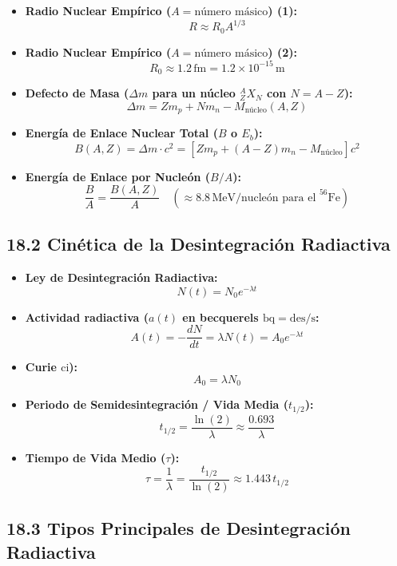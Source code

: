 \documentclass[11pt,a4paper]{article}
\begin{document}
\begin{itemize}
  \item \textbf{Radio Nuclear Empírico ($A = \text{número másico}$) (1):}
  \[
    R \approx R_0 A^{1/3}
  \]
  \item \textbf{Radio Nuclear Empírico ($A = \text{número másico}$) (2):}
  \[
    R_0 \approx 1.2 \, \mathrm{fm} = 1.2 \times 10^{-15} \, \mathrm{m}
  \]
  \item \textbf{Defecto de Masa ($\Delta m$ para un núcleo $_Z^A X_N$ con $N = A - Z$):}
  \[
    \Delta m = Z m_p + N m_n - M_{\text{núcleo}}(A, Z)
  \]
  \item \textbf{Energía de Enlace Nuclear Total ($B$ o $E_b$):}
  \[
    B(A, Z) = \Delta m \cdot c^2 = [Z m_p + (A - Z) m_n - M_{\text{núcleo}}] c^2
  \]
  \item \textbf{Energía de Enlace por Nucleón ($B/A$):}
  \[
    \frac{B}{A} = \frac{B(A, Z)}{A} \quad (\approx 8.8 \, \text{MeV/nucleón para el } ^{56}\mathrm{Fe})
  \]
\end{itemize}

\subsection*{18.2 Cinética de la Desintegración Radiactiva}

\begin{itemize}
  \item \textbf{Ley de Desintegración Radiactiva:}
  \[
    N(t) = N_0 e^{-\lambda t}
  \]
  \item \textbf{Actividad radiactiva ($a(t)$ en becquerels $\mathrm{bq} = \mathrm{des/s}$:}
  \[
    A(t) = -\frac{dN}{dt} = \lambda N(t) = A_0 e^{-\lambda t}
  \]
  \item \textbf{Curie $\mathrm{ci}$):}
  \[
    A_0 = \lambda N_0
  \]
  \item \textbf{Periodo de Semidesintegración / Vida Media ($t_{1/2}$):}
  \[
    t_{1/2} = \frac{\ln(2)}{\lambda} \approx \frac{0.693}{\lambda}
  \]
  \item \textbf{Tiempo de Vida Medio ($\tau$):}
  \[
    \tau = \frac{1}{\lambda} = \frac{t_{1/2}}{\ln(2)} \approx 1.443 \, t_{1/2}
  \]
\end{itemize}

\subsection*{18.3 Tipos Principales de Desintegración Radiactiva}
\end{document}
